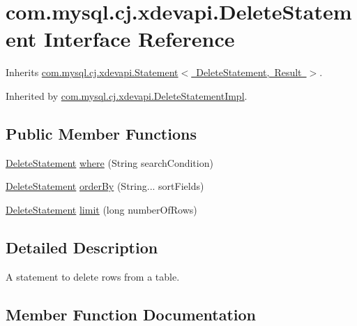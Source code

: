 \hypertarget{interfacecom_1_1mysql_1_1cj_1_1xdevapi_1_1_delete_statement}{}\section{com.\+mysql.\+cj.\+xdevapi.\+Delete\+Statement Interface Reference}
\label{interfacecom_1_1mysql_1_1cj_1_1xdevapi_1_1_delete_statement}


Inherits \mbox{\hyperlink{interfacecom_1_1mysql_1_1cj_1_1xdevapi_1_1_statement}{com.\+mysql.\+cj.\+xdevapi.\+Statement$<$ Delete\+Statement, Result $>$}}.



Inherited by \mbox{\hyperlink{classcom_1_1mysql_1_1cj_1_1xdevapi_1_1_delete_statement_impl}{com.\+mysql.\+cj.\+xdevapi.\+Delete\+Statement\+Impl}}.

\subsection*{Public Member Functions}
\begin{DoxyCompactItemize}
\item 
\mbox{\hyperlink{interfacecom_1_1mysql_1_1cj_1_1xdevapi_1_1_delete_statement}{Delete\+Statement}} \mbox{\hyperlink{interfacecom_1_1mysql_1_1cj_1_1xdevapi_1_1_delete_statement_ab8e3a9ff4710cb66ffa5aba7740700af}{where}} (String search\+Condition)
\item 
\mbox{\hyperlink{interfacecom_1_1mysql_1_1cj_1_1xdevapi_1_1_delete_statement}{Delete\+Statement}} \mbox{\hyperlink{interfacecom_1_1mysql_1_1cj_1_1xdevapi_1_1_delete_statement_aa2f42b5eaf29813d63a78cc6a5f553a7}{order\+By}} (String... sort\+Fields)
\item 
\mbox{\hyperlink{interfacecom_1_1mysql_1_1cj_1_1xdevapi_1_1_delete_statement}{Delete\+Statement}} \mbox{\hyperlink{interfacecom_1_1mysql_1_1cj_1_1xdevapi_1_1_delete_statement_a3eab5fbbfbfd3e97b9e6705d44721f19}{limit}} (long number\+Of\+Rows)
\end{DoxyCompactItemize}


\subsection{Detailed Description}
A statement to delete rows from a table. 

\subsection{Member Function Documentation}
\mbox{\label{interfacecom_1_1mysql_1_1cj_1_1xdevapi_1_1_delete_statement_a3eab5fbbfbfd3e97b9e6705d44721f19}} 
